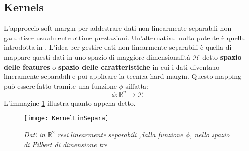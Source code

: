 \subsection{Kernels}
L'approccio soft margin per addestrare dati non linearmente separabili non garantisce usualmente ottime prestazioni. Un'alternativa molto potente è quella introdotta in \cite{Vapnik92}. L'idea per gestire dati non linearmente separabili è quella di mappare questi dati in uno spazio di maggiore dimensionalità $\mathcal{H}$ detto \textbf{spazio delle features} o \textbf{spazio delle caratteristiche} in cui i dati diventano lineramente separabili e poi applicare la tecnica hard margin. Questo mapping può essere fatto tramite una funzione $\phi$ siffatta:
\begin{equation*}
\phi : \mathbb{R}^n \to \mathcal{H}
\end{equation*}
L'immagine \ref{fig:kls} illustra quanto appena detto. 

\begin{figure}[htp]
	\centering
	\texttt{[image: KernelLinSepara]}
	\caption[Mapping in feature space]{\textit{Dati in $\mathbb{R}^{2}$ resi linearmente separabili ,dalla funzione $\phi$, nello spazio di Hilbert di dimensione tre}}
   \label{fig:kls}
\end{figure}


